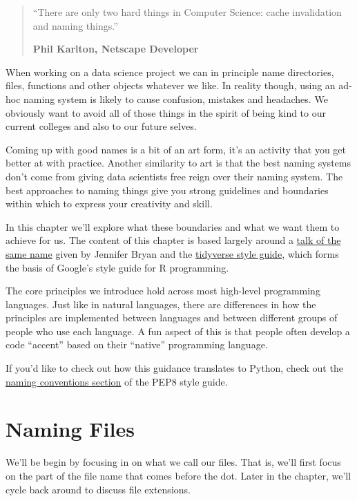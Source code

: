 \documentclass[
  letterpaper,
  DIV=11,
  numbers=noendperiod]{scrreprt}
\begin{document}
\begin{quote}
``There are only two hard things in Computer Science: cache invalidation
and naming things.''

\textbf{Phil Karlton, Netscape Developer}
\end{quote}

When working on a data science project we can in principle name
directories, files, functions and other objects whatever we like. In
reality though, using an ad-hoc naming system is likely to cause
confusion, mistakes and headaches. We obviously want to avoid all of
those things in the spirit of being kind to our current colleges and
also to our future selves.

Coming up with good names is a bit of an art form, it's an activity that
you get better at with practice. Another similarity to art is that the
best naming systems don't come from giving data scientists free reign
over their naming system. The best approaches to naming things give you
strong guidelines and boundaries within which to express your creativity
and skill.

In this chapter we'll explore what these boundaries and what we want
them to achieve for us. The content of this chapter is based largely
around a \href{https://speakerdeck.com/jennybc/how-to-name-files}{talk
of the same name} given by Jennifer Bryan and the
\href{https://style.tidyverse.org/}{tidyverse style guide}, which forms
the basis of Google's style guide for R programming.

The core principles we introduce hold across most high-level programming
languages. Just like in natural languages, there are differences in how
the principles are implemented between languages and between different
groups of people who use each language. A fun aspect of this is that
people often develop a code ``accent'' based on their ``native''
programming language.

If you'd like to check out how this guidance translates to Python, check
out the
\href{https://peps.python.org/pep-0008/\#naming-conventions}{naming
conventions section} of the PEP8 style guide.

\section{Naming Files}\label{naming-files}

We'll be begin by focusing in on what we call our files. That is, we'll
first focus on the part of the file name that comes before the dot.
Later in the chapter, we'll cycle back around to discuss file
extensions.
\end{document}
